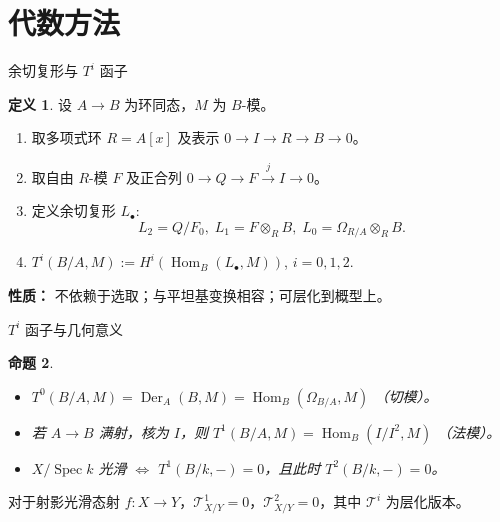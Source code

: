 \documentclass{beamer}
\theoremstyle{definition}
\newtheorem{defn}{定义}[section]
\theoremstyle{plain}
\newtheorem{prop}[defn]{命题}
\begin{document}
\section{代数方法}
\begin{frame}{余切复形与 $T^i$ 函子}
\begin{defn}
设 $A\to B$ 为环同态，$M$ 为 $B$-模。
\begin{enumerate}
    \item 取多项式环 $R=A[x]$ 及表示 $0\to I\to R\to B\to0$。
    \item 取自由 $R$-模 $F$ 及正合列 $0\to Q\to F\xrightarrow{j} I\to0$。
    \item 定义余切复形 $L_\bullet$:
    \[
    L_2 = Q/F_0,\; L_1 = F\otimes_R B,\; L_0 = \Omega_{R/A}\otimes_R B.
    \]
    \item $T^i(B/A,M) := H^i(\operatorname{Hom}_B(L_\bullet, M))$, $i=0,1,2$.
\end{enumerate}
\end{defn}
\textbf{性质：} 不依赖于选取；与平坦基变换相容；可层化到概型上。
\end{frame}

\begin{frame}{$T^i$ 函子与几何意义}
\begin{prop}
\begin{itemize}
    \item $T^0(B/A,M) = \operatorname{Der}_A(B,M) = \operatorname{Hom}_B(\Omega_{B/A},M)$ （切模）。
    \item 若 $A\to B$ 满射，核为 $I$，则 $T^1(B/A,M)=\operatorname{Hom}_B(I/I^2,M)$ （法模）。
    \item $X/\operatorname{Spec} k$ 光滑 $\iff$ $T^1(B/k,-)=0$，且此时 $T^2(B/k,-)=0$。
\end{itemize}
\end{prop}
对于射影光滑态射 $f:X\to Y$，$\mathcal{T}^1_{X/Y}=0$，$\mathcal{T}^2_{X/Y}=0$，其中 $\mathcal{T}^i$ 为层化版本。
\end{frame}
\end{document}
